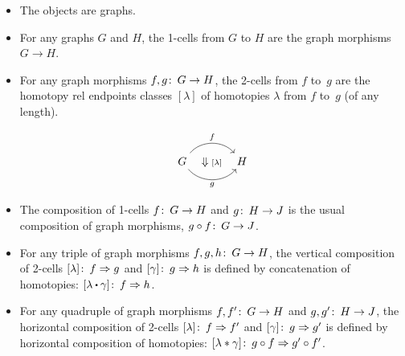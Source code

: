 \documentclass[11pt,a4paper]{article}
\begin{document}
	\begin{itemize}
		\item The objects are graphs.
		
		\item For any graphs $G$ and $H$, the 1-cells from $G$ to $H$ are the graph morphisms $G\to H$.
		
		\item For any graph morphisms $f,g\colon\thinspace G\to H$, the 2-cells from $f$ to~$g$ are the homotopy rel endpoints classes $[\lambda]$ of homotopies $\lambda$ from $f$ to~$g$ (of any length).
		
		\begin{equation*}
			\begin{tikzcd}[column sep=large]
				G 
				\arrow[bend left=50]{r}{f}
				\arrow[r, phantom, "\Downarrow\mathsmaller{[\lambda]}"]
				\arrow[bend right=50, swap]{r}{g}
				& H
			\end{tikzcd}
		\end{equation*}

		\item The composition of 1-cells $f\colon\thinspace G\to H$ and $g\colon\thinspace H\to J$ is the usual composition of graph morphisms, $g\mathbin{\circ} f\colon\thinspace G\to J$.

		\item For any triple of graph morphisms $f,g,h\colon\thinspace G\to H$, the vertical composition of 2-cells $[\lambda]\colon\thinspace f\Rightarrow g$ and $[\gamma]\colon\thinspace g\Rightarrow h$ is defined by concatenation of homotopies: $[\lambda\bigcdot\gamma]\co f\Rightarrow h$.

		\item For any quadruple of graph morphisms $f,f'\colon\thinspace G\to H$ and $g,g'\colon\thinspace H\to J$, the horizontal composition of 2-cells $[\lambda]\colon\thinspace f\Rightarrow f'$ and $[\gamma]\colon\thinspace g\Rightarrow g'$ is defined by horizontal composition of homotopies: $[\lambda\ast\gamma]\colon\thinspace g\mathbin{\circ} f\Rightarrow g'\mathbin{\circ} f'$.
	\end{itemize}
	
\nocite{*}
\printbibliography
\end{document}
